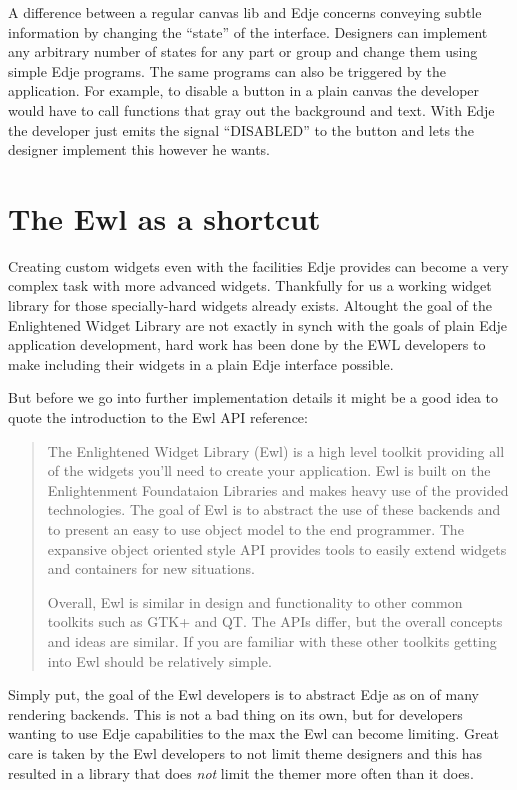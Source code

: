 \documentclass[12pt,a4paper,english]{book}
\begin{document}
A difference between a regular canvas lib and Edje concerns conveying subtle
information by changing the ``state'' of the interface. Designers can implement
any arbitrary number of states for any part or group and change them using
simple Edje programs. The same programs can also be triggered by the
application. For example, to disable a button in a plain canvas the developer
would have to call functions that gray out the background and text. With Edje
the developer just emits the signal ``DISABLED'' to the button and lets the
designer implement this however he wants.



\hypertarget{the-ewl-as-a-shortcut}{}
\section{The Ewl as a shortcut}

Creating custom widgets even with the facilities Edje provides can become a
very complex task with more advanced widgets. Thankfully for us a working
widget library for those specially-hard widgets already exists. Altought the
goal of the Enlightened Widget Library are not exactly in synch with the goals
of plain Edje application development, hard work has been done by the EWL
developers to make including their widgets in a plain Edje interface possible.

But before we go into further implementation details it might be a good idea to
quote the introduction to the Ewl API reference:
\begin{quote}

The Enlightened Widget Library (Ewl) is a high level toolkit providing all
of the widgets you'll need to create your application. Ewl is built on the
Enlightenment Foundataion Libraries and makes heavy use of the provided
technologies. The goal of Ewl is to abstract the use of these backends and
to present an easy to use object model to the end programmer. The expansive
object oriented style API provides tools to easily extend widgets and
containers for new situations.

Overall, Ewl is similar in design and functionality to other common
toolkits such as GTK+ and QT. The APIs differ, but the overall concepts and
ideas are similar. If you are familiar with these other toolkits getting
into Ewl should be relatively simple.
\end{quote}

Simply put, the goal of the Ewl developers is to abstract Edje as on of many
rendering backends. This is not a bad thing on its own, but for developers
wanting to use Edje capabilities to the max the Ewl can become limiting. Great
care is taken by the Ewl developers to not limit theme designers and this has
resulted in a library that does \emph{not} limit the themer more often than it does.
\end{document}
